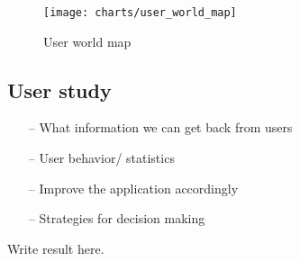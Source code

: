 \begin{figure}[htb]
\centering \texttt{[image: charts/user\_world\_map]}
\caption{User world map \label{chart7}}
\end{figure}

\begin{table}[htb]
\caption{Receiver type statistic \label{Table8}}
\begin{center}
\end{center}
\end{table}


\subsection{User study}
\begin{itemize}
\item[--]What information we can get back from users
\item[--]User behavior/ statistics
\item[--]Improve the application accordingly
\item[--]Strategies for decision making
\end{itemize}
Write result here.
